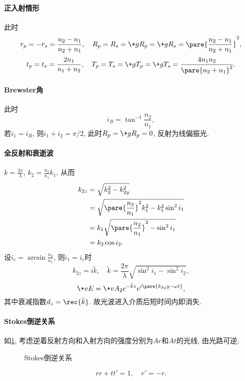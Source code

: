\documentclass{ctexart}
\begin{document}
\paragraph{正入射情形} %
\label{par:正入射情形}

此时
\[ r_p = -r_s = \frac{n_2-n_1}{n_2+n_1},\quad R_p = R_s = \+gR_p = \+gR_s = \pare{\frac{n_2-n_1}{n_2+n_1}}^2, \]
\[ t_p = t_s = \frac{2n_1}{n_1+n_2},\quad T_p = T_s = \+gT_p = \+gT_s = \frac{4n_1n_2}{\pare{n_2+n_1}^2}. \]


\paragraph{Brewster角} %
\label{par:brewster角}

此时
\[ i_B = \tan^{-1} \frac{n_2}{n_1}, \]
若$i_1 = i_B$, 则$i_1 + i_2 = \pi/2$, 此时$R_p = \+gR_p = 0$, 反射为线偏振光.


\paragraph{全反射和衰逝波} %
\label{par:全反射和衰逝波}

$k = \displaystyle\frac{2\pi}{\lambda}$, $k_2 = \displaystyle \frac{n_2}{n_1}k_1$, 从而
\begin{align*}
     k_{2z} &= \sqrt{k_2^2 - k_{2y}^2}\\
     &= \sqrt{\pare{\frac{n_2}{n_1}}^2 k_1^2 - k_1^2 \sin^2 i_1}\\
     &= k_1\sqrt{\pare{\frac{n_2}{n_1}}^2 - \sin^2 i_1}\\
     &= k_2\cos i_2.
\end{align*}
设$i_c = \arcsin\displaystyle \frac{n_2}{n_1}$, 则$i_1=i_c$时
\[ k_{2z} = i\tilde{k},\quad \tilde{k} = \frac{2\pi}{\lambda}\sqrt{\sin^2 i_1 - \sin^2 i_2}, \]
\[ \+vE = \+vA_2 e^{-\tilde{k} z} e^{i\pare{k_{2y} y - \omega t}}, \]
其中衰减指数$\displaystyle d_z = \rec{\tilde{k}}$. 故光波进入介质后短时间内即消失.


\paragraph{Stokes倒逆关系} %
\label{par:stokes倒逆关系}

如\cref{fig:Stokes倒逆关系}, 考虑逆着反射方向和入射方向的强度分别为$Ar$和$At$的光线, 由光路可逆,
\begin{figure}
    \centering
    \begin{subfigure}{.47\textwidth}
        \centering
        \caption{}
    \end{subfigure}
    \begin{subfigure}{.47\textwidth}
        \centering
        \caption{}
    \end{subfigure}
    \caption{Stokes倒逆关系}
    \label{fig:Stokes倒逆关系}
\end{figure}
\[ rr + tt' = 1,\quad r' = -r. \]
\end{document}
